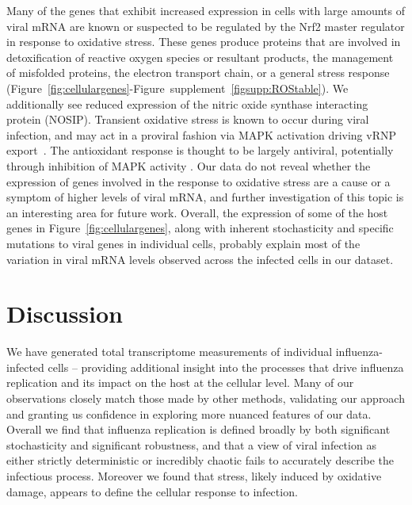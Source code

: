 \documentclass[9pt,lineno]{elife}
\begin{document}
Many of the genes that exhibit increased expression in cells with large amounts of viral mRNA are known or suspected to be regulated by the Nrf2 master regulator in response to oxidative stress.
These genes produce proteins that are involved in detoxification of reactive oxygen species or resultant products, the management of misfolded proteins, the electron transport chain, or a general stress response (Figure~\ref{fig:cellulargenes}-Figure~supplement~\ref{figsupp:ROStable}). 
We additionally see reduced expression of the nitric oxide synthase interacting protein (NOSIP). 
Transient oxidative stress is known to occur during viral infection, and may act in a proviral fashion via MAPK activation driving vRNP export~\citep{Amatore:2014cs}.
The antioxidant response is thought to be largely antiviral, potentially through inhibition of MAPK activity \citep{Lin:2016ec,Sgarbanti:2014ht}.
Our data do not reveal whether the expression of genes involved in the response to oxidative stress are a cause or a symptom of higher levels of viral mRNA, and further investigation of this topic is an interesting area for future work.
Overall, the expression of some of the host genes in Figure~\ref{fig:cellulargenes}, along with inherent stochasticity and specific mutations to viral genes in individual cells, probably explain most of the variation in viral mRNA levels observed across the infected cells in our dataset.

\section{Discussion}
We have generated total transcriptome measurements of individual influenza-infected cells -- providing additional insight into the processes that drive influenza replication and its impact on the host at the cellular level.
Many of our observations closely match those made by other methods, validating our approach and granting us confidence in exploring more nuanced features of our data.
Overall we find that influenza replication is defined broadly by both significant stochasticity and significant robustness, and that a view of viral infection as either strictly deterministic or incredibly chaotic fails to accurately describe the infectious process.
Moreover we found that stress, likely induced by oxidative damage, appears to define the cellular response to infection.
\end{document}
